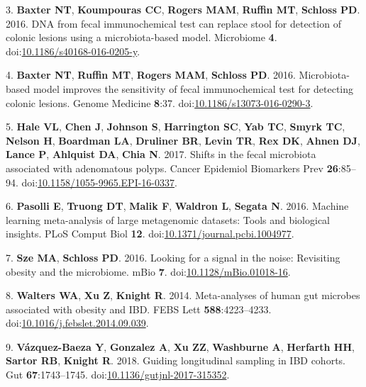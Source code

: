 \documentclass[11pt,]{article}
\begin{document}
\hypertarget{ref-baxter_dna_2016}{}
3. \textbf{Baxter NT}, \textbf{Koumpouras CC}, \textbf{Rogers MAM},
\textbf{Ruffin MT}, \textbf{Schloss PD}. 2016. DNA from fecal
immunochemical test can replace stool for detection of colonic lesions
using a microbiota-based model. Microbiome \textbf{4}.
doi:\href{https://doi.org/10.1186/s40168-016-0205-y}{10.1186/s40168-016-0205-y}.

\hypertarget{ref-baxter_microbiota-based_2016}{}
4. \textbf{Baxter NT}, \textbf{Ruffin MT}, \textbf{Rogers MAM},
\textbf{Schloss PD}. 2016. Microbiota-based model improves the
sensitivity of fecal immunochemical test for detecting colonic lesions.
Genome Medicine \textbf{8}:37.
doi:\href{https://doi.org/10.1186/s13073-016-0290-3}{10.1186/s13073-016-0290-3}.

\hypertarget{ref-hale_shifts_2017}{}
5. \textbf{Hale VL}, \textbf{Chen J}, \textbf{Johnson S},
\textbf{Harrington SC}, \textbf{Yab TC}, \textbf{Smyrk TC},
\textbf{Nelson H}, \textbf{Boardman LA}, \textbf{Druliner BR},
\textbf{Levin TR}, \textbf{Rex DK}, \textbf{Ahnen DJ}, \textbf{Lance P},
\textbf{Ahlquist DA}, \textbf{Chia N}. 2017. Shifts in the fecal
microbiota associated with adenomatous polyps. Cancer Epidemiol
Biomarkers Prev \textbf{26}:85--94.
doi:\href{https://doi.org/10.1158/1055-9965.EPI-16-0337}{10.1158/1055-9965.EPI-16-0337}.

\hypertarget{ref-pasolli_machine_2016}{}
6. \textbf{Pasolli E}, \textbf{Truong DT}, \textbf{Malik F},
\textbf{Waldron L}, \textbf{Segata N}. 2016. Machine learning
meta-analysis of large metagenomic datasets: Tools and biological
insights. PLoS Comput Biol \textbf{12}.
doi:\href{https://doi.org/10.1371/journal.pcbi.1004977}{10.1371/journal.pcbi.1004977}.

\hypertarget{ref-sze_looking_2016}{}
7. \textbf{Sze MA}, \textbf{Schloss PD}. 2016. Looking for a signal in
the noise: Revisiting obesity and the microbiome. mBio \textbf{7}.
doi:\href{https://doi.org/10.1128/mBio.01018-16}{10.1128/mBio.01018-16}.

\hypertarget{ref-walters_meta-analyses_2014}{}
8. \textbf{Walters WA}, \textbf{Xu Z}, \textbf{Knight R}. 2014.
Meta-analyses of human gut microbes associated with obesity and IBD.
FEBS Lett \textbf{588}:4223--4233.
doi:\href{https://doi.org/10.1016/j.febslet.2014.09.039}{10.1016/j.febslet.2014.09.039}.

\hypertarget{ref-vazquez-baeza_guiding_2018}{}
9. \textbf{Vázquez-Baeza Y}, \textbf{Gonzalez A}, \textbf{Xu ZZ},
\textbf{Washburne A}, \textbf{Herfarth HH}, \textbf{Sartor RB},
\textbf{Knight R}. 2018. Guiding longitudinal sampling in IBD cohorts.
Gut \textbf{67}:1743--1745.
doi:\href{https://doi.org/10.1136/gutjnl-2017-315352}{10.1136/gutjnl-2017-315352}.
\end{document}
